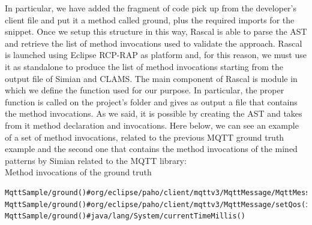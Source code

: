 In particular, we have added the fragment of code pick up from the developer's client file and put it a method called ground, plus the required imports for the snippet.
Once we setup this structure in this way, Rascal is able to parse the AST and retrieve the list of method invocations used to validate the approach.
Rascal is launched using Eclipse RCP-RAP as platform and, for this reason, we must use it as standalone to produce the list of method invocations starting from the output file of Simian and CLAMS. The main component of Rascal is module in which we define the function used for our purpose. In particular, the proper function is called on the project's folder and gives as output a file that contains the method invocations. As we said, it is possible by creating the AST and takes from it method declaration and invocations. Here below, we can see an example of a set of method invocations, related to the previous MQTT ground truth example and the second one that contains the method invocations of the mined patterns by Simian related to the MQTT library:\\
Method invocations of the ground truth

\begin{lstlisting}
MqttSample/ground()#org/eclipse/paho/client/mqttv3/MqttMessage/MqttMessage(byte[])
MqttSample/ground()#org/eclipse/paho/client/mqttv3/MqttMessage/setQos(int)
MqttSample/ground()#java/lang/System/currentTimeMillis()
\end{lstlisting}

